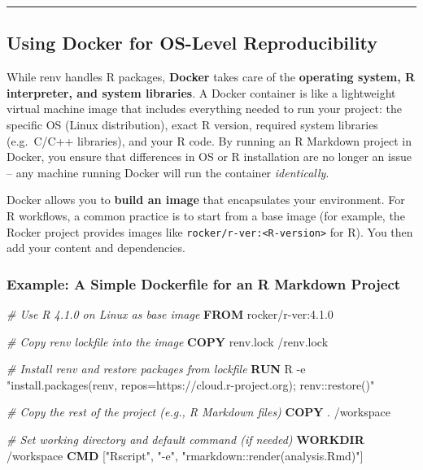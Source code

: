 \documentclass[
  11pt,
]{article}
\newenvironment{Shaded}{\begin{snugshade}}{\end{snugshade}}
\newcommand{\AttributeTok}[1]{\textcolor[rgb]{0.13,0.29,0.53}{#1}}
\newcommand{\CommentTok}[1]{\textcolor[rgb]{0.56,0.35,0.01}{\textit{#1}}}
\newcommand{\ExtensionTok}[1]{#1}
\newcommand{\KeywordTok}[1]{\textcolor[rgb]{0.13,0.29,0.53}{\textbf{#1}}}
\newcommand{\NormalTok}[1]{#1}
\newcommand{\StringTok}[1]{\textcolor[rgb]{0.31,0.60,0.02}{#1}}
\begin{document}
\begin{center}\rule{0.5\linewidth}{0.5pt}\end{center}

\subsection{Using Docker for OS-Level
Reproducibility}\label{using-docker-for-os-level-reproducibility}

While renv handles R packages, \textbf{Docker} takes care of the
\textbf{operating system, R interpreter, and system libraries}. A Docker
container is like a lightweight virtual machine image that includes
everything needed to run your project: the specific OS (Linux
distribution), exact R version, required system libraries (e.g.~C/C++
libraries), and your R code. By running an R Markdown project in Docker,
you ensure that differences in OS or R installation are no longer an
issue -- any machine running Docker will run the container
\emph{identically}.

Docker allows you to \textbf{build an image} that encapsulates your
environment. For R workflows, a common practice is to start from a base
image (for example, the Rocker project provides images like
\texttt{rocker/r-ver:\textless{}R-version\textgreater{}} for R). You
then add your content and dependencies.

\subsubsection{Example: A Simple Dockerfile for an R Markdown
Project}\label{example-a-simple-dockerfile-for-an-r-markdown-project}

\begin{Shaded}
\begin{Highlighting}[]
\CommentTok{\# Use R 4.1.0 on Linux as base image}
\KeywordTok{FROM}\NormalTok{ rocker/r{-}ver:4.1.0  }

\CommentTok{\# Copy renv lockfile into the image}
\KeywordTok{COPY}\NormalTok{ renv.lock /renv.lock}

\CommentTok{\# Install renv and restore packages from lockfile}
\KeywordTok{RUN} \ExtensionTok{R} \AttributeTok{{-}e} \StringTok{"install.packages(\textquotesingle{}renv\textquotesingle{}, repos=\textquotesingle{}https://cloud.r{-}project.org\textquotesingle{}); renv::restore()"}  

\CommentTok{\# Copy the rest of the project (e.g., R Markdown files)}
\KeywordTok{COPY}\NormalTok{ . /workspace}

\CommentTok{\# Set working directory and default command (if needed)}
\KeywordTok{WORKDIR}\NormalTok{ /workspace}
\KeywordTok{CMD}\NormalTok{ [}\StringTok{"Rscript"}\NormalTok{, }\StringTok{"{-}e"}\NormalTok{, }\StringTok{"rmarkdown::render(\textquotesingle{}analysis.Rmd\textquotesingle{})"}\NormalTok{]}
\end{Highlighting}
\end{Shaded}
\end{document}
